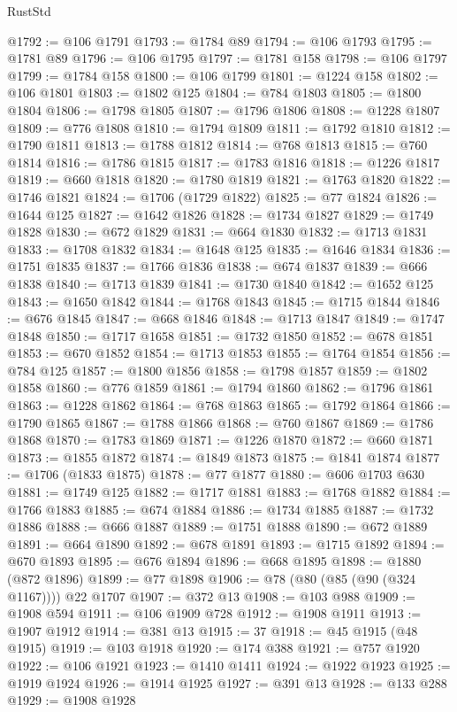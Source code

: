\begin{lexlean}{RustStd}
\begin{coremodule}
@1792 := @106 @1791
@1793 := @1784 @89
@1794 := @106 @1793
@1795 := @1781 @89
@1796 := @106 @1795
@1797 := @1781 @158
@1798 := @106 @1797
@1799 := @1784 @158
@1800 := @106 @1799
@1801 := @1224 @158
@1802 := @106 @1801
@1803 := @1802 @125
@1804 := @784 @1803
@1805 := @1800 @1804
@1806 := @1798 @1805
@1807 := @1796 @1806
@1808 := @1228 @1807
@1809 := @776 @1808
@1810 := @1794 @1809
@1811 := @1792 @1810
@1812 := @1790 @1811
@1813 := @1788 @1812
@1814 := @768 @1813
@1815 := @760 @1814
@1816 := @1786 @1815
@1817 := @1783 @1816
@1818 := @1226 @1817
@1819 := @660 @1818
@1820 := @1780 @1819
@1821 := @1763 @1820
@1822 := @1746 @1821
@1824 := @1706 (@1729 @1822)
@1825 := @77 @1824
@1826 := @1644 @125
@1827 := @1642 @1826
@1828 := @1734 @1827
@1829 := @1749 @1828
@1830 := @672 @1829
@1831 := @664 @1830
@1832 := @1713 @1831
@1833 := @1708 @1832
@1834 := @1648 @125
@1835 := @1646 @1834
@1836 := @1751 @1835
@1837 := @1766 @1836
@1838 := @674 @1837
@1839 := @666 @1838
@1840 := @1713 @1839
@1841 := @1730 @1840
@1842 := @1652 @125
@1843 := @1650 @1842
@1844 := @1768 @1843
@1845 := @1715 @1844
@1846 := @676 @1845
@1847 := @668 @1846
@1848 := @1713 @1847
@1849 := @1747 @1848
@1850 := @1717 @1658
@1851 := @1732 @1850
@1852 := @678 @1851
@1853 := @670 @1852
@1854 := @1713 @1853
@1855 := @1764 @1854
@1856 := @784 @125
@1857 := @1800 @1856
@1858 := @1798 @1857
@1859 := @1802 @1858
@1860 := @776 @1859
@1861 := @1794 @1860
@1862 := @1796 @1861
@1863 := @1228 @1862
@1864 := @768 @1863
@1865 := @1792 @1864
@1866 := @1790 @1865
@1867 := @1788 @1866
@1868 := @760 @1867
@1869 := @1786 @1868
@1870 := @1783 @1869
@1871 := @1226 @1870
@1872 := @660 @1871
@1873 := @1855 @1872
@1874 := @1849 @1873
@1875 := @1841 @1874
@1877 := @1706 (@1833 @1875)
@1878 := @77 @1877
@1880 := @606 @1703 @630
@1881 := @1749 @125
@1882 := @1717 @1881
@1883 := @1768 @1882
@1884 := @1766 @1883
@1885 := @674 @1884
@1886 := @1734 @1885
@1887 := @1732 @1886
@1888 := @666 @1887
@1889 := @1751 @1888
@1890 := @672 @1889
@1891 := @664 @1890
@1892 := @678 @1891
@1893 := @1715 @1892
@1894 := @670 @1893
@1895 := @676 @1894
@1896 := @668 @1895
@1898 := @1880 (@872 @1896)
@1899 := @77 @1898
@1906 := @78 (@80 (@85 (@90 (@324 @1167)))) @22 @1707
@1907 := @372 @13
@1908 := @103 @988
@1909 := @1908 @594
@1911 := @106 @1909 @728
@1912 := @1908 @1911
@1913 := @1907 @1912
@1914 := @381 @13
@1915 := 37
@1918 := @45 @1915 (@48 @1915)
@1919 := @103 @1918
@1920 := @174 @388
@1921 := @757 @1920
@1922 := @106 @1921
@1923 := @1410 @1411
@1924 := @1922 @1923
@1925 := @1919 @1924
@1926 := @1914 @1925
@1927 := @391 @13
@1928 := @133 @288
@1929 := @1908 @1928

\end{coremodule}
\end{lexlean}
